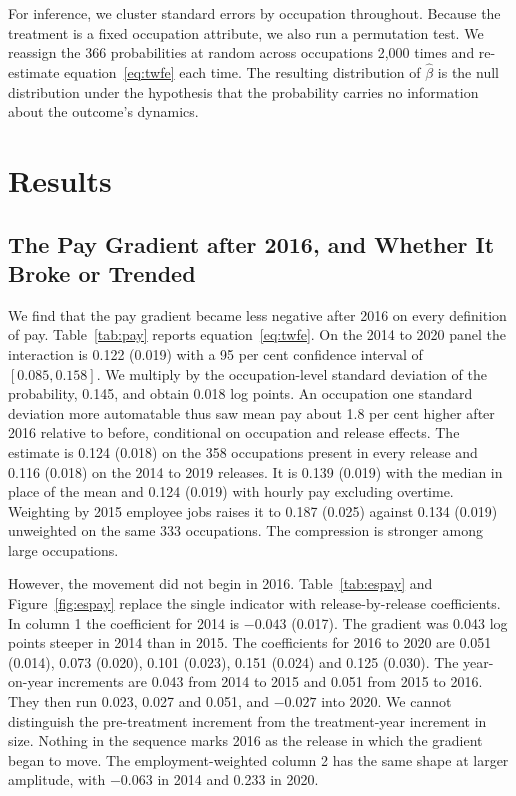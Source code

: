 \documentclass[12pt,leqno]{article}
\begin{document}
For inference, we cluster standard errors by occupation throughout. Because the treatment is a fixed occupation attribute, we also run a permutation test. We reassign the 366 probabilities at random across occupations 2,000 times and re-estimate equation~\eqref{eq:twfe} each time. The resulting distribution of $\hat{\beta}$ is the null distribution under the hypothesis that the probability carries no information about the outcome's dynamics.

\section{Results}\label{sec:results}

\subsection{The Pay Gradient after 2016, and Whether It Broke or Trended}

We find that the pay gradient became less negative after 2016 on every definition of pay. Table~\ref{tab:pay} reports equation~\eqref{eq:twfe}. On the 2014 to 2020 panel the interaction is 0.122 (0.019) with a 95 per cent confidence interval of $[0.085, 0.158]$. We multiply by the occupation-level standard deviation of the probability, 0.145, and obtain 0.018 log points. An occupation one standard deviation more automatable thus saw mean pay about 1.8 per cent higher after 2016 relative to before, conditional on occupation and release effects. The estimate is 0.124 (0.018) on the 358 occupations present in every release and 0.116 (0.018) on the 2014 to 2019 releases. It is 0.139 (0.019) with the median in place of the mean and 0.124 (0.019) with hourly pay excluding overtime. Weighting by 2015 employee jobs raises it to 0.187 (0.025) against 0.134 (0.019) unweighted on the same 333 occupations. The compression is stronger among large occupations.



However, the movement did not begin in 2016. Table~\ref{tab:espay} and Figure~\ref{fig:espay} replace the single indicator with release-by-release coefficients. In column 1 the coefficient for 2014 is $-0.043$ (0.017). The gradient was 0.043 log points steeper in 2014 than in 2015. The coefficients for 2016 to 2020 are 0.051 (0.014), 0.073 (0.020), 0.101 (0.023), 0.151 (0.024) and 0.125 (0.030). The year-on-year increments are 0.043 from 2014 to 2015 and 0.051 from 2015 to 2016. They then run 0.023, 0.027 and 0.051, and $-0.027$ into 2020. We cannot distinguish the pre-treatment increment from the treatment-year increment in size. Nothing in the sequence marks 2016 as the release in which the gradient began to move. The employment-weighted column 2 has the same shape at larger amplitude, with $-0.063$ in 2014 and 0.233 in 2020.
\end{document}
